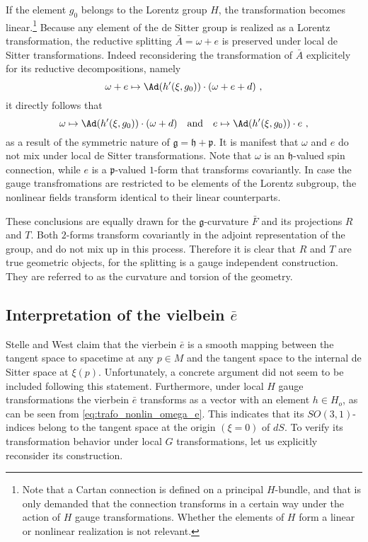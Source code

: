 \documentclass[11pt]{article}
\begin{document}
If the element $g_0$ belongs to the Lorentz group $H$, the 
transformation becomes linear.\footnote{Note that a Cartan 
	connection is defined on a principal $H$-bundle, and that is 
	only demanded that the connection transforms in a certain way 
	under the action of $H$ gauge transformations.  Whether the 
	elements of $H$ form a linear or nonlinear realization is not 
	relevant.}
Because any element of the de Sitter group is realized as a 
Lorentz transformation, the reductive splitting $\bar{A} = \omega 
+ e$ is preserved under local de Sitter transformations.
Indeed reconsidering the transformation of $\bar{A}$ explicitely 
for its reductive decompositions, namely 
%
\begin{displaymath}
	\omega + e \mapsto \Ad(h'(\xi,g_0))\cdot (\omega + e + d)~,
\end{displaymath}
it directly follows that
%
\begin{equation}
	\label{eq:trafo_nonlin_omega_e}
	\omega \mapsto \Ad(h'(\xi,g_0)) \cdot (\omega + d)
	\quad\text{and}\quad
	e \mapsto \Ad(h'(\xi,g_0)) \cdot e~,
\end{equation}
as a result of the symmetric nature of $\mathfrak{g} = 
\mathfrak{h} + \mathfrak{p}$.
It is manifest that $\omega$ and $e$ do not mix under local de 
Sitter transformations. Note that $\omega$ is an 
$\mathfrak{h}$-valued spin connection, while $e$ is a 
$\mathfrak{p}$-valued $1$-form that transforms covariantly. In 
case the gauge transfromations are restricted to be elements of 
the Lorentz subgroup, the nonlinear fields transform identical to 
their linear counterparts. 

These conclusions are equally drawn for the 
$\mathfrak{g}$-curvature $\bar{F}$ and its projections $R$ and 
$T$. Both $2$-forms transform covariantly in the adjoint 
representation of the group, and do not mix up in this process.  
Therefore it is clear that $R$ and $T$ are true geometric 
objects, for the splitting is a gauge independent construction.  
They are referred to as the curvature and torsion of the 
geometry.


\subsection{Interpretation of the vielbein $\bar{e}$}

Stelle and West \cite{Stelle:1979va,stelle.west:1980ds} claim 
that the vierbein $\bar{e}$ is a smooth mapping between the 
tangent space to spacetime at any $p \in M$  and the tangent 
space to the internal de Sitter space at $\xi(p)$. Unfortunately, 
a concrete argument did not seem to be included following this 
statement.  Furthermore, under local $H$ gauge transformations 
the vierbein $\bar{e}$ transforms as a vector with an element $h 
\in H_o$, as can be seen from \eqref{eq:trafo_nonlin_omega_e}.  
This indicates that its $SO(3,1)$-indices belong to the tangent 
space at the origin $(\xi = 0)$ of $dS$. To verify its 
transformation behavior under local $G$ transformations, let us 
explicitly reconsider its construction.  
\end{document}
